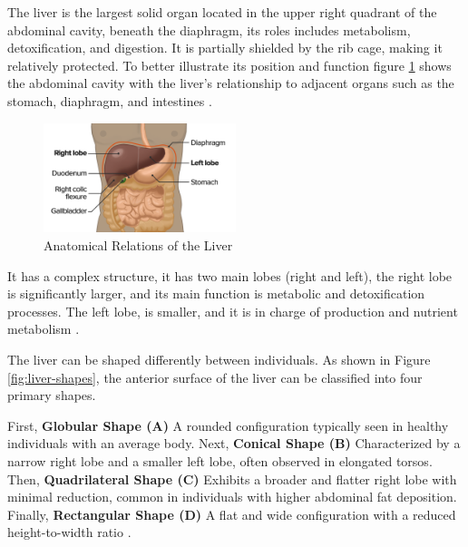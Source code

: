 The liver is the largest solid organ located in the upper right quadrant of the abdominal cavity, beneath the diaphragm, its roles includes metabolism, detoxification, and digestion. It is partially shielded by the rib cage, making it relatively protected. To better illustrate its position and function figure \ref{fig:liver-relations} shows the abdominal cavity with the liver’s relationship to adjacent organs such as the stomach, diaphragm, and intestines \cite{lecturio2023,ozmen2020}. 

\begin{figure}[H] %
	\centering
	\includegraphics[width=0.5\textwidth]{assets/Liver-relations.png} %
	\caption{Anatomical Relations of the Liver}
	\label{fig:liver-relations}
\end{figure}

It has a complex structure, it has two main lobes (right and left), the right lobe is significantly larger, and its main function is metabolic and detoxification processes. The left lobe, is smaller, and it is in charge of production and nutrient metabolism \cite{ozmen2020}.

The liver can be shaped differently between individuals. As shown in Figure \ref{fig:liver-shapes}, the anterior surface of the liver can be classified into four primary shapes.

First, \textbf{Globular Shape (A)} A rounded configuration typically seen in healthy individuals with an average body. Next, \textbf{Conical Shape (B)} Characterized by a narrow right lobe and a smaller left lobe, often observed in elongated torsos. Then, \textbf{Quadrilateral Shape (C)} Exhibits a broader and flatter right lobe with minimal reduction, common in individuals with higher abdominal fat deposition. Finally, \textbf{Rectangular Shape (D)} A flat and wide configuration with a reduced height-to-width ratio \cite{ozmen2020,diagnostics13142371}.


